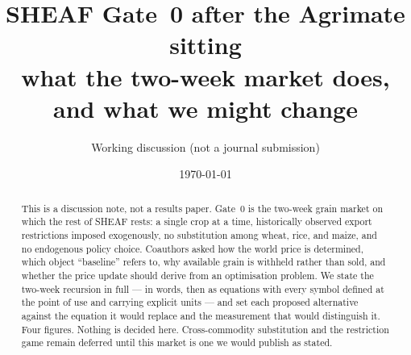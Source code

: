 \documentclass[11pt,a4paper]{article}
\title{SHEAF Gate~0 after the Agrimate sitting\\
\large what the two-week market does, and what we might change}
\author{Working discussion (not a journal submission)}
\date{\today}
\begin{document}
\maketitle

\begin{abstract}
This is a discussion note, not a results paper. Gate~0 is the two-week
grain market on which the rest of SHEAF rests: a single crop at a time,
historically observed export restrictions imposed exogenously, no
substitution among wheat, rice, and maize, and no endogenous policy
choice. Coauthors asked how the world price is determined, which object
``baseline'' refers to, why available grain is withheld rather than sold,
and whether the price update should derive from an optimisation problem.
We state the two-week recursion in full --- in words, then as equations
with every symbol defined at the point of use and carrying explicit units
--- and set each proposed alternative against the equation it would
replace and the measurement that would distinguish it. Four figures.
Nothing is decided here. Cross-commodity substitution and the restriction
game remain deferred until this market is one we would publish as stated.
\end{abstract}

\tableofcontents
\vspace{1em}









\end{document}
